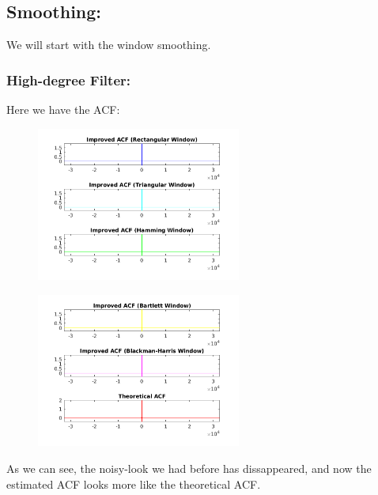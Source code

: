 \documentclass[a4paper,11pt]{article}
\begin{document}
\newpage

\subsection{Smoothing:}

We will start with the window smoothing.

\subsubsection{High-degree Filter:}

Here we have the ACF:

\begin{figure}[!hp]
    \begin{center}
      \includegraphics[width=0.6\textwidth]{images/study2/acf_hd_plot1.png}
    \end{center}
\end{figure}

\begin{figure}[!hp]
    \begin{center}
      \includegraphics[width=0.6\textwidth]{images/study2/acf_hd_plot2.png}
    \end{center}
\end{figure}

As we can see, the noisy-look we had before has dissappeared, and now the
estimated ACF looks more like the theoretical ACF.
\end{document}
